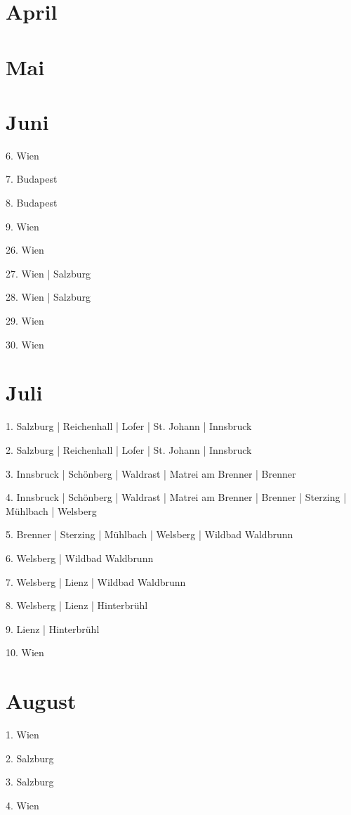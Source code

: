 \documentclass[twoside=false,titlepage=false,open=any, parskip=never, fontsize=10pt, headings=small, chapterprefix=false, appendixprefix=false, DIV=15]{scrbook}
\begin{document}
\begin{multicols}{3}
            \section*{April}
            \section*{Mai}
            \section*{Juni}
            6. Wien\par
            7. Budapest\par
            8. Budapest\par
            9. Wien\par
            26. Wien\par
            27. Wien | Salzburg\par
            28. Wien | Salzburg\par
            29. Wien\par
            30. Wien\par
            \section*{Juli}
            1. Salzburg | Reichenhall | Lofer | St. Johann | Innsbruck\par
            2. Salzburg | Reichenhall | Lofer | St. Johann | Innsbruck\par
            3. Innsbruck | Schönberg | Waldrast | Matrei am Brenner | Brenner\par
            4. Innsbruck | Schönberg | Waldrast | Matrei am Brenner | Brenner | Sterzing | Mühlbach | Welsberg\par
            5. Brenner | Sterzing | Mühlbach | Welsberg | Wildbad Waldbrunn\par
            6. Welsberg | Wildbad Waldbrunn\par
            7. Welsberg | Lienz | Wildbad Waldbrunn\par
            8. Welsberg | Lienz | Hinterbrühl\par
            9. Lienz | Hinterbrühl\par
            10. Wien\par
            \section*{August}
            1. Wien\par
            2. Salzburg\par
            3. Salzburg\par
            4. Wien\par

\end{multicols}
\end{document}
